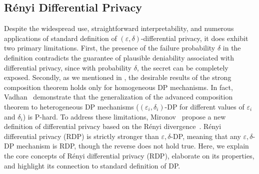 \subsection{R\'enyi Differential Privacy}
Despite the widespread use, straightforward interpretability, and numerous applications of standard definition of $(\varepsilon, \delta)$-differential privacy, it does exhibit two primary limitations. 
First, the presence of the failure probability $\delta$ in the definition contradicts the guarantee of  plausible deniability associated with differential privacy, since with probability $\delta$, the secret can be completely exposed.    
Secondly, as we mentioned in , the desirable results of the strong composition theorem holds only for homogeneous DP mechanisms.
In fact, Vadhan~ demonstrate that the generalization of the advanced composition theorem to heterogeneous DP mechanisms (\ie $(\varepsilon_i, \delta_i)$-DP for different values of $\varepsilon_i$ and $\delta_i$) is P-hard.
To address these limitations, Mironov~ propose a new definition of differential privacy based on the R\'enyi divergence~\cite{renyi1961measures}.
R\'enyi differential privacy (RDP) is strictly stronger than $\varepsilon, \delta$-DP, meaning that any $\varepsilon, \delta$-DP mechanism is RDP, though the reverse does not hold true.
Here, we explain the core concepts of R\'enyi differential privacy (RDP), elaborate on its properties, and highlight its connection to standard definition of DP.


